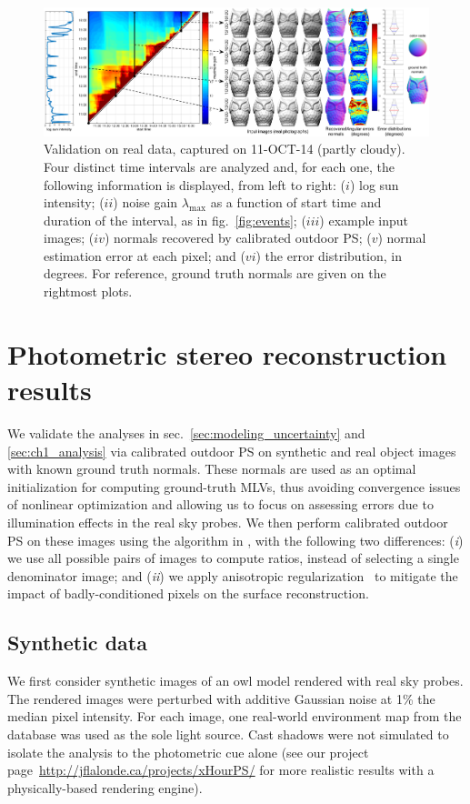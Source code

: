 \begin{figure}[t]
    \centering
    \includegraphics[width=0.92\linewidth]{./figures/realData/realData4.pdf}
    \caption[Validation on real data]{Validation on real data, captured on 11-OCT-14 (partly cloudy). Four distinct time intervals are analyzed and, for each one, the following information is displayed, from left to right: ($i$) log sun intensity; ($ii$) noise gain $\lambda_\text{max}$ as a function of start time and duration of the interval, as in fig.~\ref{fig:events}; ($iii$) example input images; ($iv$) normals recovered by calibrated outdoor PS; ($v$) normal estimation error at each pixel; and ($vi$) the error distribution, in degrees. For reference, ground truth normals are given on the rightmost plots.}
    \label{fig:real-results}
\end{figure}

\section{Photometric stereo reconstruction results}

We validate the analyses in sec.~\ref{sec:modeling_uncertainty} and \ref{sec:ch1_analysis} via calibrated outdoor PS on synthetic and real object images with known ground truth normals. These normals are used as an optimal initialization for computing ground-truth MLVs, thus avoiding convergence issues of nonlinear optimization and allowing us to focus on assessing errors due to illumination effects in the real sky probes. We then perform calibrated outdoor PS on these images using the algorithm in \cite{yu-iccp-13}, with the following two differences: (\emph{i}) we use all possible pairs of images to compute ratios, instead of selecting a single denominator image; and (\emph{ii}) we apply anisotropic regularization~\cite{hernandez-pami-11} to mitigate the impact of badly-conditioned pixels on the surface reconstruction. 

%
\subsection{Synthetic data}%
%
We first consider synthetic images of an owl model rendered with real sky probes. The rendered images were perturbed with additive Gaussian noise at 1\% the median pixel intensity. For each image, one real-world environment map from the database was used as the sole light source. Cast shadows were not simulated to isolate the analysis to the photometric cue alone (see our project page~\url{http://jflalonde.ca/projects/xHourPS/} for more realistic results with a physically-based rendering engine). 

